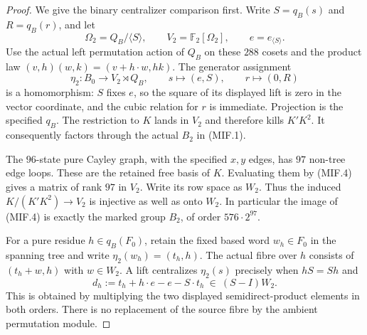 \begin{proof}
We give the binary centralizer comparison first.
Write $S=q_B(s)$ and $R=q_B(r)$, and let
\[
 \Omega_2=Q_B/\langle S\rangle,\qquad
 V_2=\mathbb F_2[\Omega_2],\qquad
 e=e_{\langle S\rangle}.
 \tag{MIF.3}
\]
Use the actual left permutation action of $Q_B$
on these $288$ cosets and the product law
$(v,h)(w,k)=(v+h\cdot w,hk)$.
The generator assignment
\[
 \eta_2:B_0\longrightarrow V_2\rtimes Q_B,
 \qquad s\longmapsto(e,S),\qquad
 r\longmapsto(0,R)
 \tag{MIF.4}
\]
is a homomorphism: $S$ fixes $e$, so the square
of its displayed lift is zero in the vector
coordinate, and the cubic relation for $r$ is
immediate.  Projection is the specified $q_B$.
The restriction to $K$ lands in $V_2$ and therefore
kills $K'K^2$.  It consequently factors through
the actual $B_2$ in (MIF.1).

The $96$-state pure Cayley graph, with the specified
$x,y$ edges, has $97$ non-tree edge loops.  These
are the retained free basis of $K$.  Evaluating
them by (MIF.4) gives a matrix of rank $97$ in
$V_2$.  Write its row space as $W_2$.
Thus the induced $K/(K'K^2)\to V_2$ is injective
as well as onto $W_2$.  In particular the image
of (MIF.4) is exactly the marked group $B_2$,
of order $576\cdot2^{97}$.

For a pure residue $h\in q_B(F_0)$, retain the
fixed based word $w_h\in F_0$ in the spanning
tree and write
$\eta_2(w_h)=(t_h,h)$.
The actual fibre over $h$ consists of
$(t_h+w,h)$ with $w\in W_2$.  A lift centralizes
$\eta_2(s)$ precisely when $hS=Sh$ and
\[
 d_h:=t_h+h\cdot e-e-S\cdot t_h
                         \ \in\ (S-I)W_2.
 \tag{MIF.5}
\]
This is obtained by multiplying the two displayed
semidirect-product elements in both orders.
There is no replacement of the source fibre by
the ambient permutation module.


\end{proof}
